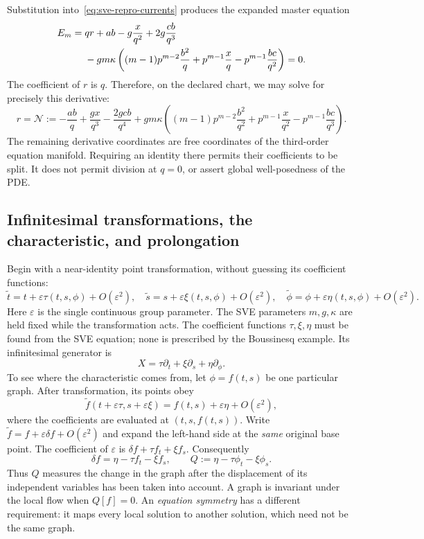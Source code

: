 \documentclass[11pt]{article}
\theoremstyle{definition}
\begin{document}
Substitution into~\eqref{eq:sve-repro-currents} produces the expanded master
equation
\begin{align}
 E_m={}&qr+ab-g\frac{x}{q^2}+2g\frac{cb}{q^3}\notag\\
 &-gm\kappa\left((m-1)p^{m-2}\frac{b^2}{q}
       +p^{m-1}\frac{x}{q}-p^{m-1}\frac{bc}{q^2}\right)=0.
 \label{eq:sve-repro-master}
\end{align}
The coefficient of $r$ is $q$. Therefore, on the declared chart, we may solve
for precisely this derivative:
\begin{equation}
 r=\mathcal N:=-\frac{ab}{q}+\frac{gx}{q^3}-\frac{2gcb}{q^4}
 +gm\kappa\left((m-1)p^{m-2}\frac{b^2}{q^2}
              +p^{m-1}\frac{x}{q^2}-p^{m-1}\frac{bc}{q^3}\right).
 \label{eq:sve-master-normal}
\end{equation}
The remaining derivative coordinates are free coordinates of the
third-order equation manifold. Requiring an identity there permits their
coefficients to be split. It does not permit division at $q=0$, or assert
global well-posedness of the PDE.

\subsection{Infinitesimal transformations, the characteristic, and prolongation}
Begin with a near-identity point transformation, without guessing its
coefficient functions:
\begin{equation}
 \widetilde t=t+\varepsilon\tau(t,s,\phi)+O(\varepsilon^2),\quad
 \widetilde s=s+\varepsilon\xi(t,s,\phi)+O(\varepsilon^2),\quad
 \widetilde\phi=\phi+\varepsilon\eta(t,s,\phi)+O(\varepsilon^2).
 \label{eq:sve-small-transformation}
\end{equation}
Here $\varepsilon$ is the single continuous group parameter. The SVE
parameters $m,g,\kappa$ are held fixed while the transformation acts.
The coefficient functions $\tau,\xi,\eta$ must be found from the SVE
equation; none is prescribed by the Boussinesq example.
Its infinitesimal generator is
\[
 X=\tau\partial_t+\xi\partial_s+\eta\partial_\phi.
\]
To see where the characteristic comes from, let $\phi=f(t,s)$ be one
particular graph. After transformation, its points obey
\[
 \widetilde f(t+\varepsilon\tau,s+\varepsilon\xi)
       =f(t,s)+\varepsilon\eta+O(\varepsilon^2),
\]
where the coefficients are evaluated at $(t,s,f(t,s))$. Write
$\widetilde f=f+\varepsilon\delta f+O(\varepsilon^2)$ and expand the
left-hand side at the \emph{same} original base point. The coefficient of
$\varepsilon$ is $\delta f+\tau f_t+\xi f_s$. Consequently
\begin{equation}
 \delta f=\eta-\tau f_t-\xi f_s,
 \qquad Q:=\eta-\tau\phi_t-\xi\phi_s.
 \label{eq:sve-characteristic-derived}
\end{equation}
Thus $Q$ measures the change in the graph after the displacement of its
independent variables has been taken into account. A graph is invariant
under the local flow when $Q[f]=0$. An \emph{equation symmetry} has a
different requirement: it maps every local solution to another solution,
which need not be the same graph.
\end{document}

